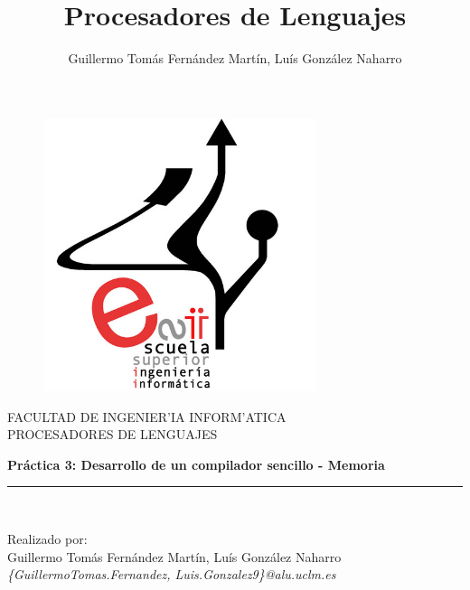 \documentclass[11pt]{article}
\title{\textbf{Procesadores de Lenguajes}}
\author{Guillermo Tomás Fernández Martín, Luís González Naharro}
\begin{document}
\begin{titlepage}

\begin{center}
\vspace*{-1in}
\begin{figure}[htb]
\begin{center}
\includegraphics[width=8cm]{esiilogo.jpg}
\end{center}
\end{figure}

FACULTAD DE INGENIER'IA INFORM'ATICA\\
\vspace*{0.15in}
PROCESADORES DE LENGUAJES\\
\vspace*{0.15in}
\vspace*{0.2in}
\begin{Large}
\textbf{Práctica 3: Desarrollo de un compilador sencillo - Memoria} \\
\end{Large}
\vspace*{0.3in}

\rule{80mm}{0.1mm}\\
\vspace*{0.1in}
\vspace*{0.3in}
\begin{large}
Realizado por:\\ Guillermo Tomás Fernández Martín, Luís González Naharro\\
\textit{\{GuillermoTomas.Fernandez, Luis.Gonzalez9\}@alu.uclm.es}

\end{large}
\end{center}

\end{titlepage}
\thispagestyle{empty}
\vspace*{7in}
\end{document}
